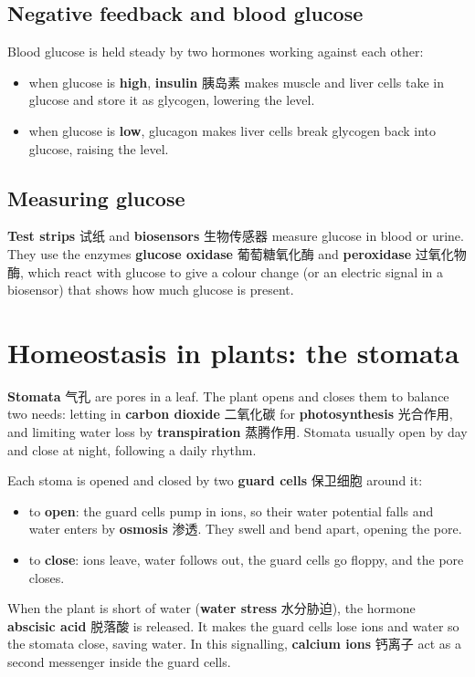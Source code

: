 \documentclass[11pt]{article}
\begin{document}
\subsection*{Negative feedback and blood glucose}

Blood glucose is held steady by two hormones working against each other:

\begin{itemize}
\item when glucose is \textbf{high}, \textbf{insulin} 胰岛素 makes muscle and liver cells take in glucose and store it as glycogen, lowering the level.

\item when glucose is \textbf{low}, glucagon makes liver cells break glycogen back into glucose, raising the level.

\end{itemize}

\subsection*{Measuring glucose}

\textbf{Test strips} 试纸 and \textbf{biosensors} 生物传感器 measure glucose in blood or urine. They use the enzymes \textbf{glucose oxidase} 葡萄糖氧化酶 and \textbf{peroxidase} 过氧化物酶, which react with glucose to give a colour change (or an electric signal in a biosensor) that shows how much glucose is present.

\section*{Homeostasis in plants: the stomata}

\textbf{Stomata} 气孔 are pores in a leaf. The plant opens and closes them to balance two needs: letting in \textbf{carbon dioxide} 二氧化碳 for \textbf{photosynthesis} 光合作用, and limiting water loss by \textbf{transpiration} 蒸腾作用. Stomata usually open by day and close at night, following a daily rhythm.

Each stoma is opened and closed by two \textbf{guard cells} 保卫细胞 around it:

\begin{itemize}
\item to \textbf{open}: the guard cells pump in ions, so their water potential falls and water enters by \textbf{osmosis} 渗透. They swell and bend apart, opening the pore.

\item to \textbf{close}: ions leave, water follows out, the guard cells go floppy, and the pore closes.

\end{itemize}

When the plant is short of water (\textbf{water stress} 水分胁迫), the hormone \textbf{abscisic acid} 脱落酸 is released. It makes the guard cells lose ions and water so the stomata close, saving water. In this signalling, \textbf{calcium ions} 钙离子 act as a second messenger inside the guard cells.
\end{document}
